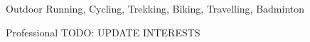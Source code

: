 



\begin{cvskills}
  \cvskill
    {Outdoor} %
    {Running, Cycling, Trekking, Biking, Travelling, Badminton} %

  \cvskill
    {Professional} %
    {TODO: UPDATE INTERESTS} %

\end{cvskills}